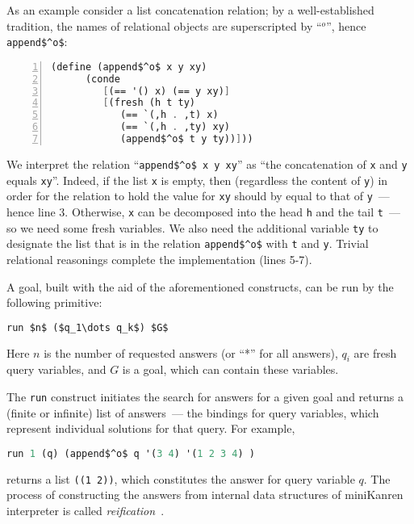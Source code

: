 As an example consider a list concatenation relation; by a well-established tradition, the names
of relational objects are superscripted by ``$^o$'', hence \lstinline{append$^o$}:

\begin{lstlisting}[mathescape=true,language=scheme,numbers=left,numberstyle=\small,stepnumber=1,numbersep=-5pt]
   (define (append$^o$ x y xy)
      (conde
         [(== '() x) (== y xy)]
         [(fresh (h t ty)
            (== `(,h . ,t) x)
            (== `(,h . ,ty) xy)
            (append$^o$ t y ty))]))
\end{lstlisting}

We interpret the relation ``\lstinline{append$^o$ x y xy}'' as ``the concatenation of \lstinline{x} and \lstinline{y}
equals \lstinline{xy}''. Indeed, if the list \lstinline{x} is empty, then (regardless the content of \lstinline{y}) in order for the relation to hold
the value for \lstinline{xy} should by equal to that of \lstinline{y}~--- hence line 3. Otherwise, \lstinline{x} can be decomposed into the head
\lstinline{h} and the tail \lstinline{t}~--- so we need some fresh variables. We also need the additional variable \lstinline{ty} to designate the list
that is in the relation \lstinline{append$^o$} with \lstinline{t} and \lstinline{y}. Trivial relational reasonings complete the implementation (lines 5-7).

A goal, built with the aid of the aforementioned constructs, can be run by the following primitive:

\begin{lstlisting}[mathescape=true,language=scheme]
   run $n$ ($q_1\dots q_k$) $G$
\end{lstlisting}

Here $n$ is the number of requested answers (or ``*'' for all answers), $q_i$ are fresh query variables, and $G$ is a goal, which can
contain these variables.

The \lstinline{run} construct initiates the search for answers for a given goal and returns a (finite or infinite) list
of answers~--- the bindings for query variables, which represent individual solutions for that query. For example,

\begin{lstlisting}[mathescape=true,language=scheme]
   run 1 (q) (append$^o$ q '(3 4) '(1 2 3 4) )
\end{lstlisting}

\noindent returns a list \lstinline{((1 2))}, which constitutes the answer for query variable $q$. The process of constructing
the answers from internal data structures of miniKanren interpreter is called \emph{reification}~\cite{WillThesis}.

